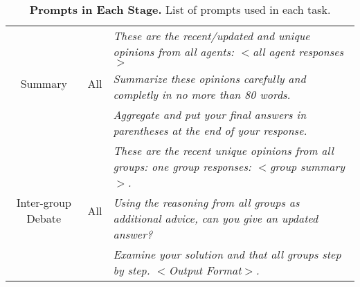 \begin{table*}[t]
{\begin{tabular}{ccl}
     \midrule
     \multirow{3}{*}{Summary}  & \multirow{3}{*}{All} & \emph{These are the recent/updated and unique opinions from all agents: $<$all agent responses$>$}\\
     & & \emph{Summarize these opinions carefully and completly in no more than 80 words. }\\
     & & \emph{Aggregate and put your final answers in parentheses at the end of your response. }\\
     \midrule
     \multirow{3}{*}{Inter-group Debate}  & \multirow{3}{*}{All} & \emph{These are the recent unique opinions from all groups: one group responses: $<$group summary$>$. } \\
      & & \emph{Using the reasoning from all groups as additional advice, can you give an updated answer?} \\
      & & \emph{Examine your solution and that all groups step by step. $<$Output Format$>$.} \\
    \bottomrule
\end{tabular}
}
\caption{\textbf{Prompts in Each Stage.} List of prompts used in each task. }
\label{tab:input-prompts}
\end{table*}


\begin{table*}[t]
\centering
{}
\caption{\textbf{Output Format Requirements in Each Dataset.}}
\label{tab:Requirements}
\end{table*}

